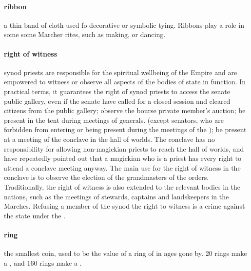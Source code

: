 \paragraph{ribbon} a thin band of cloth used fo decorative or symbolic tying. Ribbons play a role in some some Marcher rites, such as  making,  or  dancing.
\paragraph{right of witness} synod priests are responsible for the spiritual wellbeing of the Empire and are empowered to witness or observe all aspects of the bodies of state in function. In practical terms, it guarantees the right of synod priests to access the senate public gallery, even if the senate have called for a closed session and cleared citizens from the public gallery; observe the bourse private member's auction; be present in the  tent during meetings of generals. (except senators, who are forbidden from entering or being present during the meetings of the ); be present at a meeting of the conclave in the hall of worlds. The conclave has no responsibility for allowing non-magickian priests to reach the hall of worlds, and have repeatedly pointed out that a magickian who is a priest has every right to attend a conclave meeting anyway. The main use for the right of witness in the conclave is to observe the election of the grandmasters of the orders. Traditionally, the right of witness is also extended to the relevant bodies in the nations, such as the meetings of stewards, captains and landskeepers in the Marches. Refusing a member of the synod the right to witness is a crime against the state under the . 
\paragraph{ring} the smallest coin, used to be the value of a ring of  in ages gone by. 20 rings make a , and 160 rings make a . 
